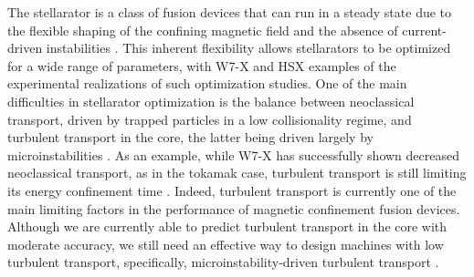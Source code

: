 \documentclass[prl,twocolumn,amsmath,amssymb,showpacs,superscriptaddress]{revtex4-2}
\begin{document}
\maketitle


The stellarator is a class of fusion devices that can run in a steady state due to the flexible shaping of the confining magnetic field and the absence of current-driven instabilities \cite{Helander2014}.
%
This inherent flexibility allows stellarators to be optimized for a wide range of parameters, with W7-X \cite{Geiger2015} and HSX \cite{Anderson1995} examples of the experimental realizations of such optimization studies.
%
One of the main difficulties in stellarator optimization is the balance between neoclassical transport, driven by trapped particles in a low collisionality regime, and turbulent transport in the core, the latter being driven largely by microinstabilities \cite{Jenko2005}.
%
As an example, while W7-X has successfully shown decreased neoclassical transport, as in the tokamak case, turbulent transport is still limiting its energy confinement time \cite{Beidler2021}.
%
Indeed, turbulent transport is currently one of the main limiting factors in the performance of magnetic confinement fusion devices.
%
Although we are currently able to predict turbulent transport in the core with {moderate} accuracy, we still need an effective way to design machines with low turbulent transport, specifically, microinstability-driven turbulent transport \cite{Jenko2005,Holland2011}.
%
\end{document}

